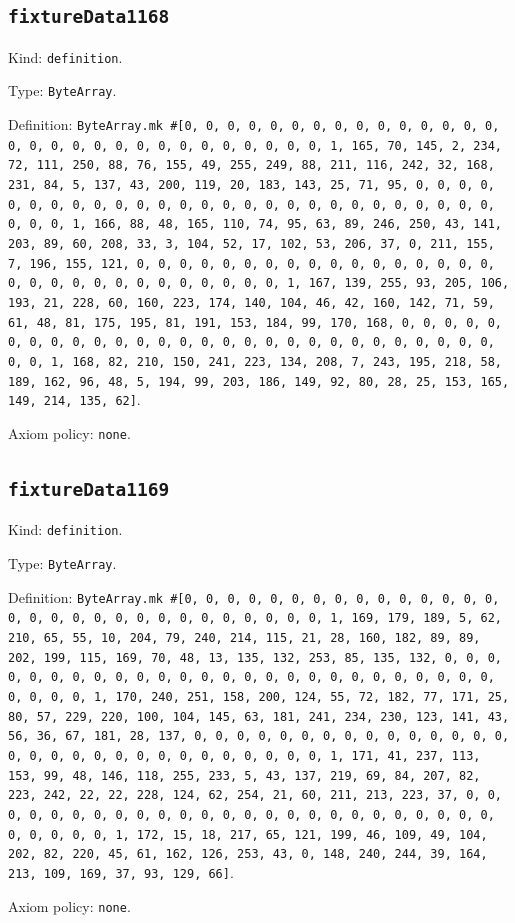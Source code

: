 \documentclass[11pt]{article}
\begin{document}
\subsection*{\texttt{fixtureData1168}}
\noindent Kind: \texttt{definition}.\par
\noindent Type: \texttt{ByteArray}.\par
\noindent Definition: \texttt{ByteArray.mk \#[0, 0, 0, 0, 0, 0, 0, 0, 0, 0, 0, 0, 0, 0, 0, 0, 0, 0, 0, 0, 0, 0, 0, 0, 0, 0, 0, 0, 0, 0, 1, 165, 70, 145, 2, 234, 72, 111, 250, 88, 76, 155, 49, 255, 249, 88, 211, 116, 242, 32, 168, 231, 84, 5, 137, 43, 200, 119, 20, 183, 143, 25, 71, 95, 0, 0, 0, 0, 0, 0, 0, 0, 0, 0, 0, 0, 0, 0, 0, 0, 0, 0, 0, 0, 0, 0, 0, 0, 0, 0, 0, 0, 0, 0, 1, 166, 88, 48, 165, 110, 74, 95, 63, 89, 246, 250, 43, 141, 203, 89, 60, 208, 33, 3, 104, 52, 17, 102, 53, 206, 37, 0, 211, 155, 7, 196, 155, 121, 0, 0, 0, 0, 0, 0, 0, 0, 0, 0, 0, 0, 0, 0, 0, 0, 0, 0, 0, 0, 0, 0, 0, 0, 0, 0, 0, 0, 0, 0, 1, 167, 139, 255, 93, 205, 106, 193, 21, 228, 60, 160, 223, 174, 140, 104, 46, 42, 160, 142, 71, 59, 61, 48, 81, 175, 195, 81, 191, 153, 184, 99, 170, 168, 0, 0, 0, 0, 0, 0, 0, 0, 0, 0, 0, 0, 0, 0, 0, 0, 0, 0, 0, 0, 0, 0, 0, 0, 0, 0, 0, 0, 0, 0, 1, 168, 82, 210, 150, 241, 223, 134, 208, 7, 243, 195, 218, 58, 189, 162, 96, 48, 5, 194, 99, 203, 186, 149, 92, 80, 28, 25, 153, 165, 149, 214, 135, 62]}.\par
\noindent Axiom policy: \texttt{none}.\par
\subsection*{\texttt{fixtureData1169}}
\noindent Kind: \texttt{definition}.\par
\noindent Type: \texttt{ByteArray}.\par
\noindent Definition: \texttt{ByteArray.mk \#[0, 0, 0, 0, 0, 0, 0, 0, 0, 0, 0, 0, 0, 0, 0, 0, 0, 0, 0, 0, 0, 0, 0, 0, 0, 0, 0, 0, 0, 0, 1, 169, 179, 189, 5, 62, 210, 65, 55, 10, 204, 79, 240, 214, 115, 21, 28, 160, 182, 89, 89, 202, 199, 115, 169, 70, 48, 13, 135, 132, 253, 85, 135, 132, 0, 0, 0, 0, 0, 0, 0, 0, 0, 0, 0, 0, 0, 0, 0, 0, 0, 0, 0, 0, 0, 0, 0, 0, 0, 0, 0, 0, 0, 0, 1, 170, 240, 251, 158, 200, 124, 55, 72, 182, 77, 171, 25, 80, 57, 229, 220, 100, 104, 145, 63, 181, 241, 234, 230, 123, 141, 43, 56, 36, 67, 181, 28, 137, 0, 0, 0, 0, 0, 0, 0, 0, 0, 0, 0, 0, 0, 0, 0, 0, 0, 0, 0, 0, 0, 0, 0, 0, 0, 0, 0, 0, 0, 0, 1, 171, 41, 237, 113, 153, 99, 48, 146, 118, 255, 233, 5, 43, 137, 219, 69, 84, 207, 82, 223, 242, 22, 22, 228, 124, 62, 254, 21, 60, 211, 213, 223, 37, 0, 0, 0, 0, 0, 0, 0, 0, 0, 0, 0, 0, 0, 0, 0, 0, 0, 0, 0, 0, 0, 0, 0, 0, 0, 0, 0, 0, 0, 0, 1, 172, 15, 18, 217, 65, 121, 199, 46, 109, 49, 104, 202, 82, 220, 45, 61, 162, 126, 253, 43, 0, 148, 240, 244, 39, 164, 213, 109, 169, 37, 93, 129, 66]}.\par
\noindent Axiom policy: \texttt{none}.\par
\end{document}
